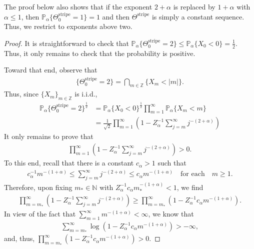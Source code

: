 \documentclass[10pt,a4paper]{amsart}
\begin{document}
	The proof below also shows that if the exponent $2 + \alpha$ is replaced by $1 + \alpha$ with $\alpha \leq 1$, then $\mathbb{P}_{\alpha}\{\Theta^{\text{stripe}}_{0} = 1\} = 1$ and then $\Theta^{\text{stripe}}$ is simply a constant sequence.  Thus, we restrict to exponents above two.
	
		\begin{proof} It is straightforward to check that $\mathbb{P}_{\alpha}\{\Theta_{0}^{\text{stripe}} = 2\} \leq \mathbb{P}_{\alpha}\{X_{0} < 0\} = \frac{1}{2}$.  Thus, it only remains to check that the probability is positive. 
		
		Toward that end, observe that 
			\begin{align*}
				\{\Theta^{\text{stripe}}_{0} = 2\} = \bigcap_{m \in \mathbb{Z}} \{X_{m} < |m|\}.
			\end{align*}
		Thus, since $\{X_{m}\}_{m \in \mathbb{Z}}$ is i.i.d.,
			\begin{align*}
				\mathbb{P}_{\alpha}\{\Theta^{\text{stripe}}_{0} = 2\}^{\frac{1}{2}}
				&= \mathbb{P}_{\alpha}\{X_{0} < 0\}^{\frac{1}{2}} \prod_{m = 1}^{\infty} \mathbb{P}_{\alpha}\{X_{m} < m\} \\
				&= \frac{1}{\sqrt{2}} \prod_{m = 1}^{\infty} \left(1 - Z_{\alpha}^{-1} \sum_{j = m}^{\infty} j^{-(2 + \alpha)} \right)
			\end{align*}
		It only remains to prove that 
			\begin{align*}
				\prod_{m = 1}^{\infty} \left(1 - Z_{\alpha}^{-1} \sum_{j = m}^{\infty} j^{-(2 + \alpha)} \right) > 0.
			\end{align*}
		To this end, recall that there is a constant $c_{\alpha} > 1$ such that
			\begin{align} \label{E: useful integral comparison algebraic}
				c_{\alpha}^{-1} m^{-(1 + \alpha)} \leq \sum_{j = m}^{\infty} j^{-(2 + \alpha)} \leq c_{\alpha} m^{-(1 + \alpha)} \quad \text{for each} \quad m \geq 1.
			\end{align}
		Therefore, upon fixing $m_{*} \in \mathbb{N}$ with $Z_{\alpha}^{-1} c_{\alpha} m_{*}^{-(1 + \alpha)} < 1$, we find
			\begin{align*}
			\prod_{m = m_{*}}^{\infty} \left(1 - Z_{\alpha}^{-1} \sum_{j = m}^{\infty} j^{-(2 + \alpha)} \right) \geq \prod_{m = m_{*}}^{\infty} \left( 1 - Z_{\alpha}^{-1} c_{\alpha} m^{-(1 + \alpha)} \right).
			\end{align*}
		In view of the fact that $\sum_{m = 1}^{\infty} m^{-(1 + \alpha)} < \infty$, we know that 
			\begin{align*}
				\sum_{m = m_{*}}^{\infty} \log \left( 1 - Z_{\alpha}^{-1} c_{\alpha} m^{-(1 + \alpha)} \right) > - \infty ,
			\end{align*}
		and, thus, $\prod_{m = m_{*}}^{\infty} \left( 1 - Z_{\alpha}^{-1} c_{\alpha} m^{-(1 + \alpha)} \right) > 0$.
		\end{proof}
\end{document}
